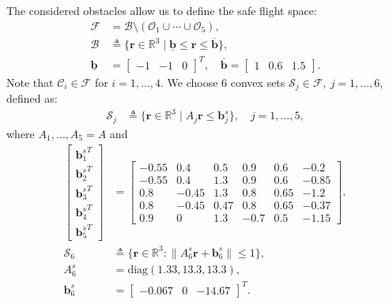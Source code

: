 \documentclass[journal,10pt]{IEEEtran}
\newcommand{\vect}[1]{\boldsymbol{\mathbf{#1}}}
\newcommand{\mat}[1]{\begin{bmatrix} #1 \end{bmatrix}}
\begin{document}
The considered obstacles allow us to define the safe flight space:
\begin{align*}
    \mathcal{F} &= \mathcal{B} \setminus( \mathcal{O}_1 \cup\cdots\cup \mathcal{O}_5),\\
    \mathcal{B}&\triangleq \{\vect{r}\in\mathbb{R}^3\mid \underline{\vect{b}}\leq\vect{r}\leq \overline{\vect{b}}\},\\
    \underline{\vect{b}} &= \mat{-1 & -1 & 0}^T, \quad \overline{\vect{b}} = \mat{1 & 0.6 & 1.5}.
\end{align*}
Note that $\mathcal{C}_i\in\mathcal{F}$ for $i=1,\ldots,4$. We choose 6 convex sets $\mathcal{S}_j\in\mathcal{F},\ j=1,\ldots,6$, defined as:
\begin{align*}
    \mathcal{S}_j &\triangleq \{\vect{r}\in\mathbb{R}^3\mid A_j\vect{r}\leq \vect{b}^s_j\}, \quad j = 1,\ldots,5,
\end{align*}
where $A_1,\ldots,A_5=A$ and 
\begin{align*}
    \mat{{\vect{b}^s_1}^T\\{\vect{b}^s_2}^T\\{\vect{b}^s_3}^T\\{\vect{b}^s_4}^T\\{\vect{b}^s_5}^T} &= \mat{
    -0.55&0.4&0.5&0.9&0.6&-0.2\\
    -0.55&0.4&1.3&0.9&0.6&-0.85\\
    0.8&-0.45&1.3&0.8&0.65&-1.2\\ 0.8&-0.45&0.47&0.8&0.65&-0.37\\ 0.9&0&1.3&-0.7&0.5&-1.15},\\
    \mathcal{S}_6 &\triangleq \{\vect{r}\in\mathbb{R}^3:\|A^s_6\vect{r}+\vect{b}_6^s\|\leq 1\},\\
    A_6^s &= \text{diag}(1.33,13.3,13.3),\\
    \vect{b}_6^s &= \mat{-0.067 & 0 & -14.67}^T.
\end{align*}
\end{document}
